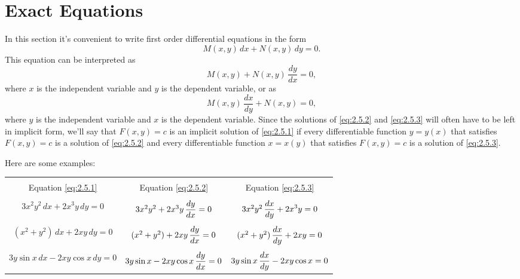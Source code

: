 \section{Exact Equations}

\noindent
In this section it's convenient to write first order differential equations in the form
\begin{equation}
  \label{eq:2.5.1}M(x,y)\,dx+N(x,y)\,dy=0.
\end{equation}
This equation can be interpreted as
\begin{equation}
  \label{eq:2.5.2}M(x,y)+N(x,y)\,\frac{dy}{dx}=0,
\end{equation}
where $x$ is the independent variable and $y$ is the dependent variable, or as
\begin{equation}
  \label{eq:2.5.3}M(x,y)\,\frac{dx}{dy}+N(x,y)=0,
\end{equation}
where $y$ is the independent variable and $x$ is the dependent variable. Since the solutions of
\eqref{eq:2.5.2} and \eqref{eq:2.5.3} will often have to be left in implicit form, we'll say that
$F(x,y)=c$ is an implicit solution of \eqref{eq:2.5.1} if every differentiable function $y=y(x)$
that satisfies $F(x,y)=c$ is a solution of \eqref{eq:2.5.2} and every differentiable function
$x=x(y)$ that satisfies $F(x,y)=c$ is a solution of \eqref{eq:2.5.3}.

Here are some examples:

\begin{center}
  \label{table:2.5.1}
  \vspace*{6pt}

  \begin{tabular}{|c|c|c|}
    \hline
                                    &                                            &                                            \\[-6pt]
    Equation \eqref{eq:2.5.1}       & Equation \eqref{eq:2.5.2}                  & Equation \eqref{eq:2.5.3}                  \\[9pt]
    \hline
                                    &                                            &                                            \\[-6pt]
    $3x^{2}y^{2}\,dx+2x^{3}y\,dy=0$ & $3x^{2}y^{2}+2x^{3}y\,\displaystyle\frac{dy}{dx}=0$ & $3x^{2}y^{2}\,\displaystyle\frac{dx}{dy}+2x^{3}y=0$ \\[9pt]
    \hline
                                    &                                            &                                            \\[-6pt]
    $(x^{2}+y^{2})\,dx+2xy\,dy=0$   & $(x^{2}+y^{2})+2xy\,\displaystyle\frac{dy}{dx}=0$   & $(x^{2}+y^{2})\,\displaystyle\frac{dx}{dy}+2xy=0$   \\[9pt]
    \hline
                                    &                                            &                                            \\[-6pt]
    $3y\sin x\,dx-2xy\cos x\,dy=0$  & $3y\sin x-2xy\cos x\,\displaystyle\frac{dy}{dx}=0$  & $3y\sin x\,\displaystyle\frac{dx}{dy}-2xy\cos x=0$  \\[9pt]
    \hline
  \end{tabular}
\end{center}

